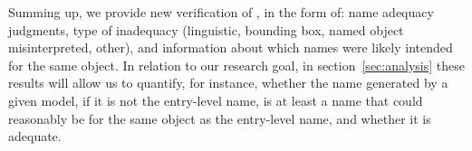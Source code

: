 Summing up, we provide new verification of \mn, in the form of: name adequacy judgments, type of inadequacy (linguistic, bounding box, named object misinterpreted, other), and information about which names were likely intended for the same object. In relation to our research goal, in section~\ref{sec:analysis} these results will allow us to quantify, for instance, whether the name generated by a given model, if it is not the entry-level name, is at least a name that could reasonably be for the same object as the entry-level name, and whether it is adequate.




